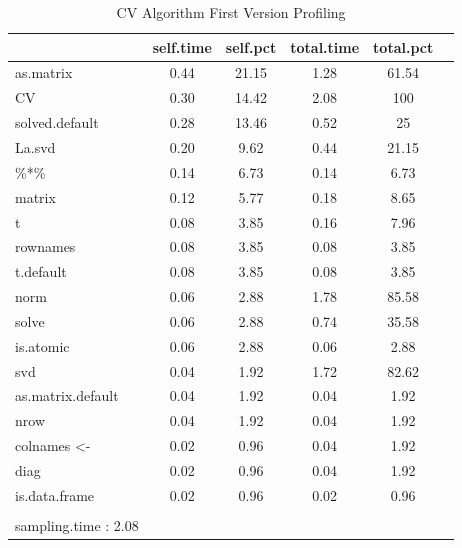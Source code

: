 \documentclass[Research_Module_ES.tex]{subfiles}
\begin{document}
\begin{table}[!h]
	\centering
	\caption{CV Algorithm First Version Profiling }\label{CValt}
	\begin{tabular}{lccccc}
		\toprule
		\midrule
		\textbf{\scriptsize }
		&\textbf{\scriptsize self.time}
		&\textbf{\scriptsize self.pct}
		&\textbf{\scriptsize total.time}
		&\textbf{\scriptsize total.pct}
		\\\midrule\midrule
		
		
		\scriptsize as.matrix& \scriptsize 0.44 & \scriptsize 21.15 &\scriptsize 1.28 & \scriptsize 61.54 \\
		\scriptsize CV  &\scriptsize 0.30 & \scriptsize 14.42 &\scriptsize 2.08 & \scriptsize 100 \\
		\scriptsize solved.default & \scriptsize 0.28 & \scriptsize 13.46 &\scriptsize 0.52 & \scriptsize 25 \\
		\scriptsize La.svd  &\scriptsize 0.20 & \scriptsize 9.62 &\scriptsize 0.44 & \scriptsize 21.15 \\
		\scriptsize \%*\% &\scriptsize 0.14 & \scriptsize 6.73 &\scriptsize 0.14& \scriptsize 6.73 \\
		\scriptsize matrix  &\scriptsize 0.12 & \scriptsize 5.77 &\scriptsize 0.18 & \scriptsize 8.65 \\
		\scriptsize t & \scriptsize 0.08 & \scriptsize 3.85 &\scriptsize 0.16 & \scriptsize 7.96 \\
		\scriptsize rownames  &\scriptsize 0.08 & \scriptsize 3.85 &\scriptsize 0.08 & \scriptsize 3.85 \\
		\scriptsize t.default  &\scriptsize 0.08 & \scriptsize 3.85 &\scriptsize 0.08 & \scriptsize 3.85\\
		\scriptsize norm  &\scriptsize 0.06 & \scriptsize 2.88 &\scriptsize 1.78 & \scriptsize  85.58\\
		\scriptsize solve  &\scriptsize  0.06 & \scriptsize 2.88 &\scriptsize 0.74  & \scriptsize 35.58 \\
		\scriptsize  is.atomic &\scriptsize  0.06 & \scriptsize 2.88  &\scriptsize 0.06 & \scriptsize 2.88 \\
		\scriptsize svd  &\scriptsize 0.04 & \scriptsize 1.92  &\scriptsize 1.72  & \scriptsize82.62  \\
		\scriptsize  as.matrix.default &\scriptsize 0.04 & \scriptsize 1.92 &\scriptsize 0.04 & \scriptsize 1.92  \\
		\scriptsize  nrow &\scriptsize 0.04 & \scriptsize 1.92 &\scriptsize 0.04 & \scriptsize  1.92\\
		\scriptsize  colnames <- &\scriptsize  0.02 & \scriptsize 0.96 &\scriptsize 0.04 & \scriptsize 1.92 \\
		\scriptsize  diag &\scriptsize 0.02 & \scriptsize 0.96 &\scriptsize 0.04 & \scriptsize  1.92\\
		\scriptsize is.data.frame  &\scriptsize  0.02 & \scriptsize  0.96 &\scriptsize  0.02& \scriptsize 0.96  \\
		\\
		\scriptsize sampling.time : 2.08
	\end{tabular}
\end{table}
\end{document}
